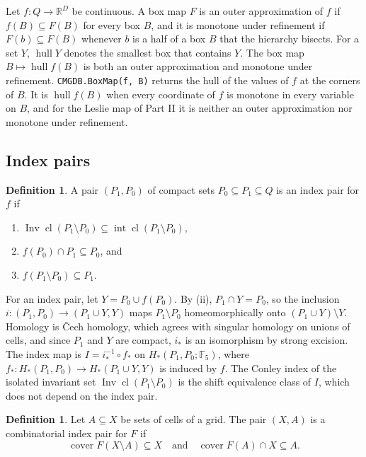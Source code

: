 \documentclass[11pt]{article}
\theoremstyle{plain}
\theoremstyle{definition}
\newtheorem{definition}[proposition]{Definition}
\theoremstyle{remark}
\DeclareMathOperator{\Inv}{Inv}
\DeclareMathOperator{\cover}{cover}
\DeclareMathOperator{\hull}{hull}
\DeclareMathOperator{\cl}{cl}
\DeclareMathOperator{\interior}{int}
\newcommand{\F}{\mathbb{F}_5}
\newcommand{\R}{\mathbb{R}}
\newcommand{\code}[1]{\texttt{#1}}
\begin{document}
Let $f\colon Q\to\R^D$ be continuous. A box map $F$ is an outer approximation of $f$ if $f(B)\subseteq F(B)$ for every box $B$, and it is monotone under refinement if $F(b)\subseteq F(B)$ whenever $b$ is a half of a box $B$ that the hierarchy bisects. For a set $Y$, $\hull Y$ denotes the smallest box that contains $Y$. The box map $B\mapsto\hull f(B)$ is both an outer approximation and monotone under refinement. \code{CMGDB.BoxMap(f, B)} returns the hull of the values of $f$ at the corners of $B$. It is $\hull f(B)$ when every coordinate of $f$ is monotone in every variable on $B$, and for the Leslie map of Part II it is neither an outer approximation nor monotone under refinement.

\subsection{Index pairs}\label{sec:pairs}

\begin{definition}\label{def:pair}
A pair $(P_1,P_0)$ of compact sets $P_0\subseteq P_1\subseteq Q$ is an index pair for $f$ if
\begin{enumerate}[label=(\roman*)]
\item $\Inv\cl(P_1\setminus P_0)\subseteq\interior\cl(P_1\setminus P_0)$,
\item $f(P_0)\cap P_1\subseteq P_0$, and
\item $f(P_1\setminus P_0)\subseteq P_1$.
\end{enumerate}
\end{definition}

For an index pair, let $Y=P_0\cup f(P_0)$. By (ii), $P_1\cap Y=P_0$, so the inclusion $i\colon(P_1,P_0)\to(P_1\cup Y,Y)$ maps $P_1\setminus P_0$ homeomorphically onto $(P_1\cup Y)\setminus Y$. Homology is \v{C}ech homology, which agrees with singular homology on unions of cells, and since $P_1$ and $Y$ are compact, $i_*$ is an isomorphism by strong excision. The index map is $I=i_*^{-1}\circ f_*$ on $H_*(P_1,P_0;\F)$, where $f_*\colon H_*(P_1,P_0)\to H_*(P_1\cup Y,Y)$ is induced by $f$. The Conley index of the isolated invariant set $\Inv\cl(P_1\setminus P_0)$ is the shift equivalence class of $I$, which does not depend on the index pair.

\begin{definition}\label{def:combpair}
Let $A\subseteq X$ be sets of cells of a grid. The pair $(X,A)$ is a combinatorial index pair for $F$ if
\[
\cover F(X\setminus A)\subseteq X\quad\text{and}\quad\cover F(A)\cap X\subseteq A.
\]
\end{definition}
\end{document}
